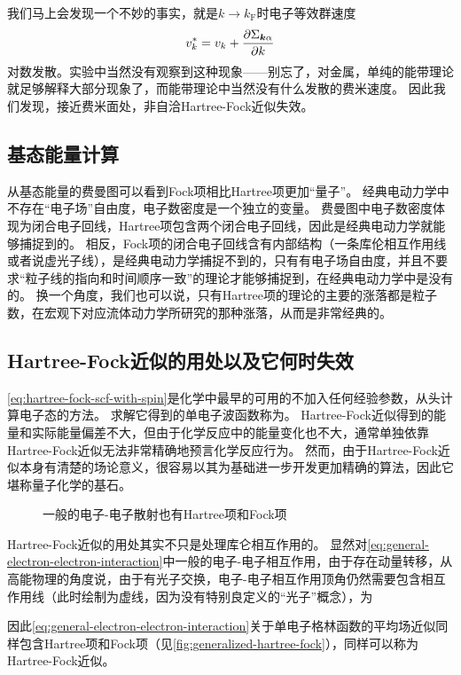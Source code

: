 我们马上会发现一个不妙的事实，就是$k \to k_\text{F}$时电子等效群速度
\begin{equation}
    v^*_k = v_k + \pdv{\Sigma_{\vb*{k} \alpha}}{k}
\end{equation}
对数发散。实验中当然没有观察到这种现象——别忘了，对金属，单纯的能带理论就足够解释大部分现象了，而能带理论中当然没有什么发散的费米速度。
因此我们发现，接近费米面处，非自洽Hartree-Fock近似失效。

\subsection{基态能量计算}

从基态能量的费曼图可以看到Fock项相比Hartree项更加“量子”。
经典电动力学中不存在“电子场”自由度，电子数密度是一个独立的变量。
费曼图中电子数密度体现为闭合电子回线，Hartree项包含两个闭合电子回线，因此是经典电动力学就能够捕捉到的。
相反，Fock项的闭合电子回线含有内部结构（一条库伦相互作用线或者说虚光子线），是经典电动力学捕捉不到的，只有有电子场自由度，并且不要求“粒子线的指向和时间顺序一致”的理论才能够捕捉到，在经典电动力学中是没有的。
换一个角度，我们也可以说，只有Hartree项的理论的主要的涨落都是粒子数，在宏观下对应流体动力学所研究的那种涨落，从而是非常经典的。

\subsection{Hartree-Fock近似的用处以及它何时失效}\label{sec:hf-success-failure}

\eqref{eq:hartree-fock-scf-with-spin}是化学中最早的可用的不加入任何经验参数，从头计算电子态的方法。
求解它得到的单电子波函数称为。
Hartree-Fock近似得到的能量和实际能量偏差不大，但由于化学反应中的能量变化也不大，通常单独依靠Hartree-Fock近似无法非常精确地预言化学反应行为。
然而，由于Hartree-Fock近似本身有清楚的场论意义，很容易以其为基础进一步开发更加精确的算法，因此它堪称量子化学的基石。

\begin{figure}
    \centering
    
    \caption{一般的电子-电子散射也有Hartree项和Fock项}
    \label{fig:generalized-hartree-fock}
\end{figure}

Hartree-Fock近似的用处其实不只是处理库仑相互作用的。
显然对\eqref{eq:general-electron-electron-interaction}中一般的电子-电子相互作用，由于存在动量转移，从高能物理的角度说，由于有光子交换，电子-电子相互作用顶角仍然需要包含相互作用线（此时绘制为虚线，因为没有特别良定义的“光子”概念），为

因此\eqref{eq:general-electron-electron-interaction}关于单电子格林函数的平均场近似同样包含Hartree项和Fock项（见\autoref{fig:generalized-hartree-fock}），同样可以称为Hartree-Fock近似。


